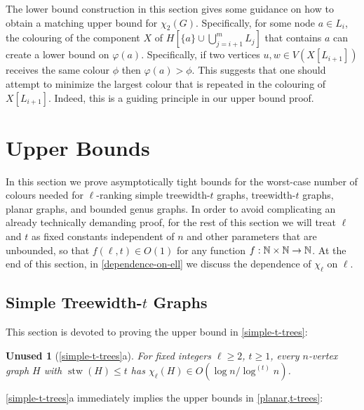 \documentclass[kpfonts]{patmorin}
\DeclareMathOperator{\stw}{stw}
\newcommand{\trn}{\chi_2}
\newcommand{\lrn}{\chi_{\ell}}
\theoremstyle{named}
\newtheorem*{namedtheorem}{Unused}
\newcommand{\weirdref}[2]{\cref{#1}#2}
\newcommand{\weirdlabel}[2]{\label{#1-#1}}
\begin{document}
The lower bound construction in this section gives some guidance on how to obtain a matching upper bound for $\trn(G)$.  Specifically, for some node $a\in L_i$, the colouring of the component $X$ of $H[\{a\}\cup\bigcup_{j=i+1}^m L_j]$ that contains $a$ can create a lower bound on $\varphi(a)$.  Specifically, if two vertices $u,w\in V(X[L_{i+1}])$ receives the same colour $\phi$ then $\varphi(a)>\phi$.  This suggests that one should attempt to minimize the largest colour that is repeated in the colouring of $X[L_{i+1}]$.  Indeed, this is a guiding principle in our upper bound proof.


\section{Upper Bounds}
\label{upper-bounds}

In this section we prove asymptotically tight bounds for the worst-case number of colours needed for $\ell$-ranking simple treewidth-$t$ graphs, treewidth-$t$ graphs, planar graphs, and bounded genus graphs. In order to avoid complicating an already technically demanding proof, for the rest of this section we will treat $\ell$ and $t$ as fixed constants independent of $n$ and other parameters that are unbounded, so that $f(\ell,t)\in O(1)$ for any function $f:\mathbb{N}\times\mathbb{N}\to\mathbb{N}$.  At the end of this section, in \cref{dependence-on-ell} we discuss the dependence of $\lrn$ on $\ell$.


\subsection{Simple Treewidth-$t$ Graphs}
\label{simple-treewidth-section}

This section is devoted to proving the upper bound in \cref{simple-t-trees}:

\begin{namedtheorem}[\weirdref{simple-t-trees}{a}]\weirdlabel{simple-t-trees}{a}
    For fixed integers $\ell\ge 2$, $t\ge 1$, every $n$-vertex graph $H$ with $\stw(H)\le t$ has $\lrn(H)\in O(\log n/\log^{(t)} n)$.
\end{namedtheorem}

\weirdref{simple-t-trees}{a} immediately implies the upper bounds in \cref{planar,t-trees}:
\end{document}
